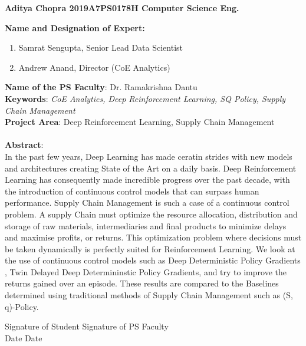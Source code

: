 \documentclass{article}
\begin{document}
\vspace{1cm}
\textbf{Aditya Chopra \hfill 2019A7PS0178H \hfill Computer Science Eng.}

\vspace{1cm}
\textbf{Name and Designation of Expert:}
\begin{enumerate}
    \item Samrat Sengupta, Senior Lead Data Scientist
    \item Andrew Anand, Director (CoE Analytics)
\end{enumerate}
\vspace{1cm}
\textbf{Name of the PS Faculty}: Dr. Ramakrishna Dantu \\
\textbf{Keywords}: \emph{CoE Analytics, Deep Reinforcement Learning, SQ Policy, Supply Chain Management} \\
\textbf{Project Area}: Deep Reinforcement Learning, Supply Chain Management \\ \\
\textbf{Abstract}: \\
In the past few years, Deep Learning has made ceratin strides with new models and architectures creating State of the Art on a daily basis. Deep Reinforcement Learning has consequently made incredible progress over the past decade, with the introduction of continuous control models that can surpass human performance. Supply Chain Management is such a case of a continuous control problem. A supply Chain must optimize the resource allocation, distribution and storage of raw materials, intermediaries and final products to minimize delays and maximise profits, or returns. This optimization problem where decisions must be taken dynamically is perfectly suited for Reinforcement Learning. We look at the use of continuous control models such as Deep Deterministic Policy Gradients \cite{lillicrap_continuous_2019}, Twin Delayed Deep Determininstic Policy Gradients\cite{fujimoto_addressing_2018}, and try to improve the returns gained over an episode. These results are compared to the Baselines determined using traditional methods of Supply Chain Management such as (S, q)-Policy.

\vfill

\begin{center}
    Signature of Student \hfill Signature of PS Faculty \\
    Date \hfill Date
\end{center}

\pagebreak
\vspace*{\fill}
\tableofcontents
\vspace*{\fill}
\pagebreak
\end{document}
